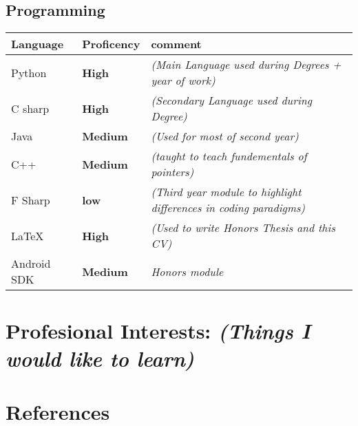 \documentclass[11pt,a4paper,sans]{moderncv} %
\begin{document}
\subsection{Programming}
\begin{tabular}{p{4cm} p{4cm} p{10cm}}
 Language   & Proficency    	& comment \\
 \hline
 Python  	& \textbf{High} 	& \textit{(Main Language used during Degrees + year of work)} 	\\
 C sharp 	& \textbf{High} 	& \textit{(Secondary Language used during Degree)} 		\\
 Java  		& \textbf{Medium} 	& \textit{(Used for most of second year)} 	\\
 C++  		& \textbf{Medium} 	& \textit{(taught to teach fundementals of pointers)} 		\\
 F Sharp  	& \textbf{low} 		& \textit{(Third year module to highlight differences in coding paradigms)} 	\\
 LaTeX  	& \textbf{High} 	& \textit{(Used to write Honors Thesis and this CV)} 		\\
 Android SDK& \textbf{Medium} 	& \textit{Honors module} 		\\
\end{tabular}


\section{Profesional Interests: \textit{(Things I would like to learn)}}
\renewcommand{\listitemsymbol}{-~} %



\section{References}
\end{document}
